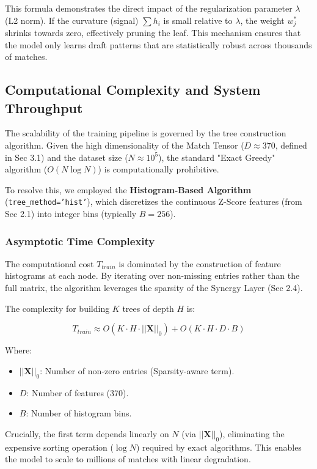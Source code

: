 \documentclass[12pt, a4paper]{article}
\begin{document}
    This formula demonstrates the direct impact of the regularization parameter $\lambda$ (L2 norm). If the curvature (signal) $\sum h_i$ is small relative to $\lambda$, the weight $w_j^*$ shrinks towards zero, effectively pruning the leaf. This mechanism ensures that the model only learns draft patterns that are statistically robust across thousands of matches.

    \subsection{Computational Complexity and System Throughput}

    The scalability of the training pipeline is governed by the tree construction algorithm. Given the high dimensionality of the Match Tensor ($D \approx 370$, defined in Sec 3.1) and the dataset size ($N \approx 10^5$), the standard "Exact Greedy" algorithm ($O(N \log N)$) is computationally prohibitive.

    To resolve this, we employed the \textbf{Histogram-Based Algorithm} (\texttt{tree\_method='hist'}), which discretizes the continuous Z-Score features (from Sec 2.1) into integer bins (typically $B=256$).


    \subsubsection{Asymptotic Time Complexity}
    The computational cost $T_{train}$ is dominated by the construction of feature histograms at each node. By iterating over non-missing entries rather than the full matrix, the algorithm leverages the sparsity of the Synergy Layer (Sec 2.4).

    The complexity for building $K$ trees of depth $H$ is:

    \begin{equation}
        T_{train} \approx O(K \cdot H \cdot ||\mathbf{X}||_0) + O(K \cdot H \cdot D \cdot B)
    \end{equation}

    Where:
    \begin{itemize}
        \item $||\mathbf{X}||_0$: Number of non-zero entries (Sparsity-aware term).
        \item $D$: Number of features (370).
        \item $B$: Number of histogram bins.
    \end{itemize}

    Crucially, the first term depends linearly on $N$ (via $||\mathbf{X}||_0$), eliminating the expensive sorting operation ($\log N$) required by exact algorithms. This enables the model to scale to millions of matches with linear degradation.
\end{document}
